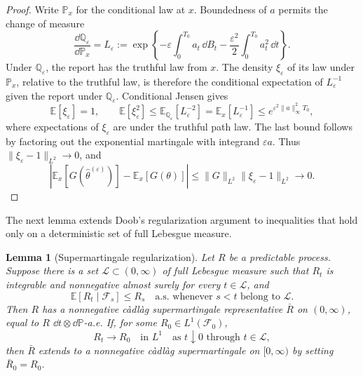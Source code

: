 \documentclass[12pt]{article}
\newtheorem{lemma}{Lemma}
\newcommand{\E}{\mathbb{E}}
\newcommand{\hth}{\hat\theta}
\begin{document}
\begin{proof}
Write \(\mathbb P_x\) for the conditional law at \(x\). Boundedness
of \(a\) permits the change of measure
\[
  \frac{\dd\mathbb Q_\varepsilon}{\dd\mathbb P_x}
  =L_\varepsilon
  :=\exp\left\{-\varepsilon\int_0^{T_0}a_t\,\dd B_t
         -\frac{\varepsilon^2}{2}\int_0^{T_0}a_t^2\,\dd t\right\}.
\]
Under \(\mathbb Q_\varepsilon\), the report has the truthful law
from \(x\). The density \(\xi_\varepsilon\) of its law under
\(\mathbb P_x\), relative to the truthful law, is therefore the
conditional expectation of \(L_\varepsilon^{-1}\) given the report
under \(\mathbb Q_\varepsilon\). Conditional Jensen gives
\[
  \E[\xi_\varepsilon]=1,\qquad
  \E[\xi_\varepsilon^2]
  \leq\E_{\mathbb Q_\varepsilon}[L_\varepsilon^{-2}]
  =\E_x[L_\varepsilon^{-1}]
  \leq e^{\varepsilon^2\|a\|_\infty^2T_0},
\]
where expectations of \(\xi_\varepsilon\) are under the truthful
path law. The last bound follows by factoring out the exponential
martingale with integrand \(\varepsilon a\).
Thus \(\|\xi_\varepsilon-1\|_{L^2}\to0\), and
\[
  \left|\E_x[G(\hth^{(\varepsilon)})]-\E_x[G(\theta)]\right|
  \leq\|G\|_{L^2}\|\xi_\varepsilon-1\|_{L^2}\longrightarrow0.
\]
\end{proof}

The next lemma extends Doob's regularization argument to inequalities
that hold only on a deterministic set of full Lebesgue measure.

\begin{lemma}[Supermartingale regularization]\label{lem:regularize}
Let \(R\) be a predictable process. Suppose there is a set
\(\mathcal L\subset(0,\infty)\) of full Lebesgue measure such that
\(R_t\) is integrable and nonnegative almost surely for every
\(t\in\mathcal L\), and
\begin{equation}\label{eq:dense-supermartingale}
  \E[R_t\mid\mathcal F_s]\le R_s
  \quad\text{a.s. whenever }s<t\text{ belong to }\mathcal L.
\end{equation}
Then \(R\) has a nonnegative c\`adl\`ag supermartingale representative
\(\bar R\) on \((0,\infty)\), equal to \(R\)
\(\dd t\otimes\dd\mathbb P\)-a.e. If, for some
\(R_0\in L^1(\mathcal F_0)\),
\[
  R_t\longrightarrow R_0
  \quad\text{in }L^1
  \quad\text{as }t\downarrow0\text{ through }t\in\mathcal L,
\]
then \(\bar R\) extends to a nonnegative c\`adl\`ag supermartingale on
\([0,\infty)\) by setting \(\bar R_0=R_0\).
\end{lemma}
\end{document}
